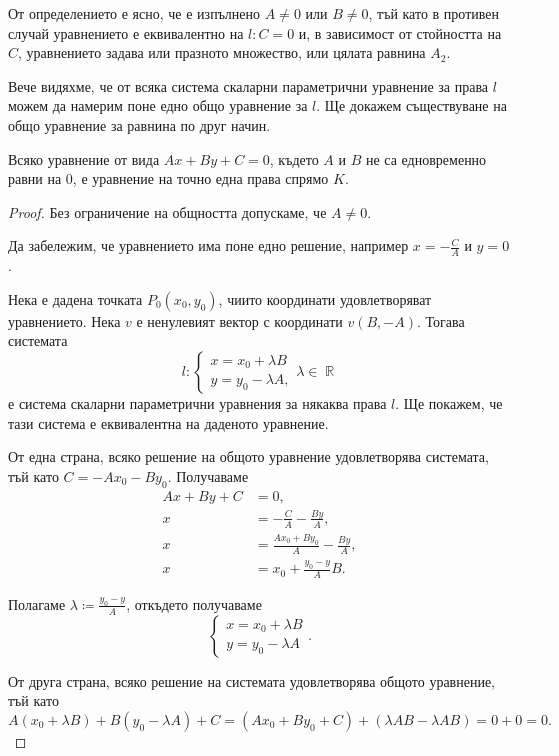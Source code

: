 \documentclass{../../common/topic}
\begin{document}
\begin{remark}
  От определението е ясно, че е изпълнено \( A \neq 0 \) или \( B \neq 0 \), тъй като в противен случай уравнението е еквивалентно на \( l: C = 0 \) и, в зависимост от стойността на \( C \), уравнението задава или празното множество, или цялата равнина \( A_2 \).
\end{remark}

Вече видяхме, че от всяка система скаларни параметрични уравнение за права \( l \) можем да намерим поне едно общо уравнение за \( l \). Ще докажем съществуване на общо уравнение за равнина по друг начин.

\begin{proposition}
  Всяко уравнение от вида \( Ax + By + C = 0 \), където \( A \) и \( B \) не са едновременно равни на \( 0 \), е уравнение на точно една права спрямо \( K \).
\end{proposition}
\begin{proof}
  Без ограничение на общността допускаме, че \( A \neq 0 \).

  Да забележим, че уравнението има поне едно решение, например \( x = -\frac C A \) и \( y = 0 \).

  Нека е дадена точката \( P_0(x_0, y_0) \), чиито координати удовлетворяват уравнението. Нека \( v \) е ненулевият вектор с координати \( v(B, -A) \). Тогава системата
  \begin{equation*}
    l: \begin{cases}
      x = x_0 + \lambda B \\
      y = y_0 - \lambda A,
    \end{cases}
    \lambda \in \BbbR
  \end{equation*}
  е система скаларни параметрични уравнения за някаква права \( l \). Ще покажем, че тази система е еквивалентна на даденото уравнение.

  От една страна, всяко решение на общото уравнение удовлетворява системата, тъй като \( C = -Ax_0 - By_0 \). Получаваме
  \begin{align*}
    Ax + By + C &= 0, \\
    x &= -\frac C A -\frac {By} A, \\
    x &= \frac {Ax_0 + By_0} A -\frac {By} A, \\
    x &= x_0 + \frac {y_0 - y} A B.
  \end{align*}

  Полагаме \( \lambda \coloneqq \frac{y_0 - y} A \), откъдето получаваме
  \begin{equation*}
    \begin{cases}
      x = x_0 + \lambda B \\
      y = y_0 - \lambda A
    \end{cases}.
  \end{equation*}

  От друга страна, всяко решение на системата удовлетворява общото уравнение, тъй като
  \begin{equation*}
    A (x_0 + \lambda B) + B (y_0 - \lambda A) + C
    =
    (A x_0 + B y_0 + C) + (\lambda AB - \lambda AB)
    =
    0 + 0 = 0.
  \end{equation*}
\end{proof}
\end{document}
